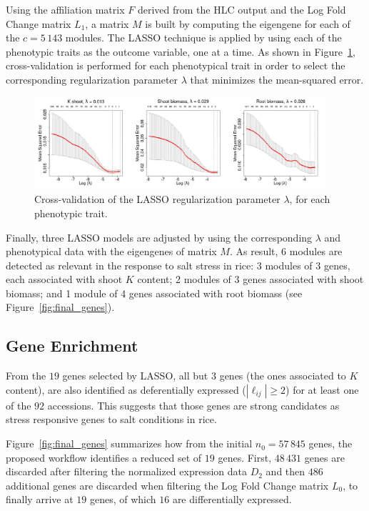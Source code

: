 \documentclass{bmcart}
\begin{document}
Using the affiliation matrix $F$ derived from the HLC output and the
Log Fold Change matrix $L_1$, a matrix $M$ is built by computing the
eigengene for each of the $c = 5\,143$ modules. The LASSO technique is
applied by using each of the phenotypic traits as the outcome
variable, one at a time. As shown in Figure~\ref{fig:cross-val},
cross-validation is performed for each phenotypical trait in order to
select the corresponding regularization parameter $\lambda$ that
minimizes the mean-squared error.
\vspace{0.5cm}

\begin{figure}[htbp]
  \centering
    \includegraphics[clip,width=0.96\textwidth]{figures/figure5.pdf}
  \caption{Cross-validation of the LASSO regularization parameter
    $\lambda$, for each phenotypic trait.}
  \label{fig:cross-val}
\end{figure}

Finally, three LASSO models are adjusted by using the corresponding
$\lambda$ and phenotypical data with the eigengenes of matrix $M$. As
result, 6 modules are detected as relevant in the response to salt
stress in rice: 3 modules of 3 genes, each associated with shoot $K$
content; 2 modules of 3 genes associated with shoot biomass; and 1
module of 4 genes associated with root biomass (see
Figure~\ref{fig:final_genes}).

\subsection*{Gene Enrichment}

From the $19$ genes selected by LASSO, all but $3$ genes (the ones
associated to $K$ content), are also identified as deferentially
expressed ($|\ell_{ij}| \geq 2$) for at least one of the $92$
accessions. This suggests that those genes are strong candidates as
stress responsive genes to salt conditions in rice.
\vspace{0.5cm}

Figure~\ref{fig:final_genes} summarizes how from the initial
$n_0=57\,845$ genes, the proposed workflow identifies a reduced set of
$19$ genes. First, $48\,431$ genes are discarded after filtering the
normalized expression data $D_2$ and then $486$ additional genes are
discarded when filtering the Log Fold Change matrix $L_0$, to finally
arrive at $19$ genes, of which $16$ are differentially expressed.
\vspace{0.5cm}
\end{document}
